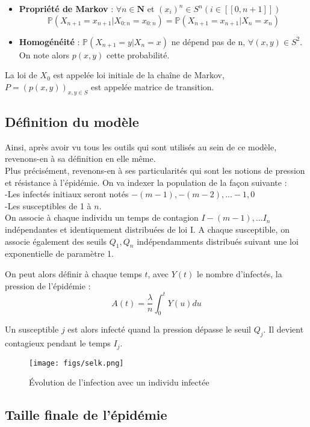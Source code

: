 \begin{itemize}
    \item \textbf{Propriété de Markov} : $\forall n \in \boldsymbol{N}$ et $(x_i)^n \in S^n (i \in [[0, n+1]])$ \\
$$ \mathbb{P}(X_{n+1} = x_{n+1} | X_{0:n} = x_{0:n}) = \mathbb{P}(X_{n+1} = x_{n+1} | X_n = x_n) $$
    \item \textbf{Homogénéité} : $\mathbb{P}(X_{n+1} = y | X_n = x)$ ne dépend pas de n, $\forall (x, y) \in S^2$. On note alors $p(x, y)$ cette probabilité.
\end{itemize}

La loi de $X_0$ est appelée loi initiale de la chaîne de Markov, $P = (p(x, y))_{x,y \in S}$ est appelée matrice de transition.



\subsection{Définition du modèle}

Ainsi, après avoir vu tous les outils qui sont utilisés au sein de ce modèle, revenons-en à sa définition en elle même. \\
Plus précisément, revenons-en à ses particularités qui sont les notions de pression et résistance à l'épidémie. On va indexer la population de la façon suivante :\\
-Les infectés initiaux seront notés $-(m-1), -(m-2), ...  -1, 0$\\
-Les susceptibles de 1 à $n$.\\
On associe à chaque individu un temps de contagion $I-(m-1), ...I_n$ indépendantes et identiquement distribuées de loi I. A chaque susceptible, on associe également des seuils $Q_1, Q_n$ indépendamments distribués suivant une loi exponentielle de paramètre 1.

On peut alors définir à chaque temps $t$, avec $Y(t)$ le nombre d'infectés, la pression de l'épidémie :
$$ A(t) = \frac{\lambda}{n} \int^t_0 Y(u)du $$

Un susceptible $j$ est alors infecté quand la pression dépasse le seuil $Q_j$. Il devient contagieux pendant le temps $I_j$.

\begin{figure}[h]
\centering
\texttt{[image: figs/selk.png]}
\caption{Évolution de l'infection avec un individu infectée}
\label{fig:selk}
\end{figure}

\subsection{Taille finale de l'épidémie}

